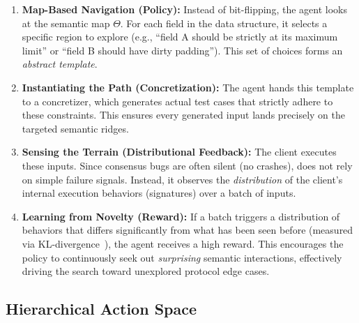 \begin{enumerate}
    \item \textbf{Map-Based Navigation (Policy):} Instead of bit-flipping, the agent looks at the semantic map $\Theta$. For each field in the data structure, it selects a specific region to explore (e.g., ``field A should be strictly at its maximum limit'' or ``field B should have dirty padding''). This set of choices forms an \textit{abstract template}.
    \item \textbf{Instantiating the Path (Concretization):} The agent hands this template to a concretizer, which generates actual test cases that strictly adhere to these constraints. This ensures every generated input lands precisely on the targeted semantic ridges.
    \item \textbf{Sensing the Terrain (Distributional Feedback):} The client executes these inputs. Since consensus bugs are often silent (no crashes), \tool does not rely on simple failure signals. Instead, it observes the \textit{distribution} of the client's internal execution behaviors (signatures) over a batch of inputs.
    \item \textbf{Learning from Novelty (Reward):} If a batch triggers a distribution of behaviors that differs significantly from what has been seen before (measured via KL-divergence~\cite{kullback1951information}), the agent receives a high reward. This encourages the policy to continuously seek out \emph{surprising} semantic interactions, effectively driving the search toward unexplored protocol edge cases.
\end{enumerate}

\subsection{Hierarchical Action Space}

